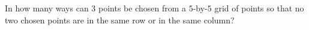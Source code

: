 In how many ways can $3$ points be chosen from a $5$-by-$5$ grid of points so that no two chosen points are in the same row or in the same column?
